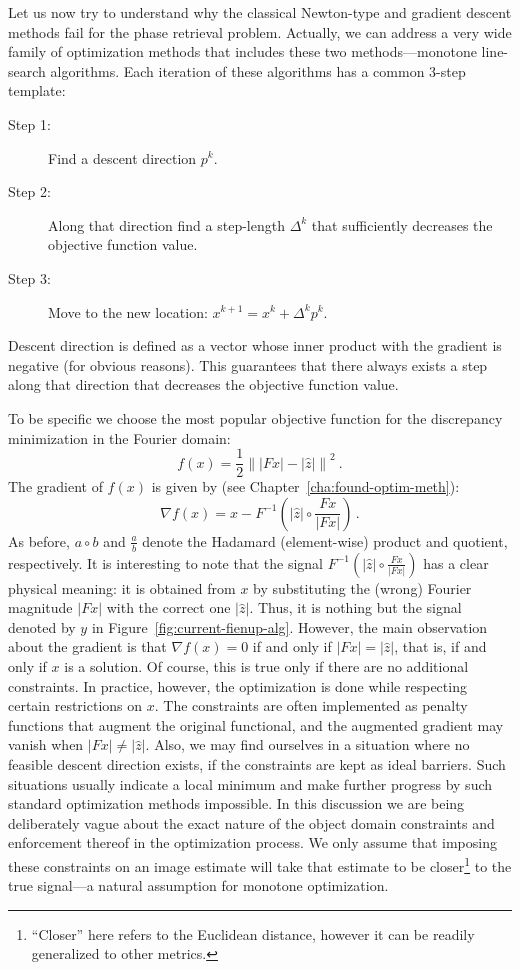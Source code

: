 Let us now try to understand why the classical Newton-type and
gradient descent methods fail for the phase retrieval
problem. Actually, we can address a very wide family of optimization
methods that includes these two methods---monotone line-search
algorithms. Each iteration of these algorithms has a common 3-step
template:
\begin{description}
\item[Step 1:] Find a descent direction $p^{k}$.
\item[Step 2:] Along that direction find a step-length $\Delta^{k}$
  that sufficiently decreases the objective function value.
\item[Step 3:] Move to the new location: $x^{k+1} = x^{k}+\Delta^{k}p^{k}$.
\end{description}
Descent direction is defined as a vector whose
inner product with the gradient is negative (for obvious reasons). This
guarantees that there always exists a step along that direction that decreases the
objective function value.

To be specific we choose the most popular objective
function for the discrepancy minimization in the Fourier domain:
\begin{equation}
  \label{eq:approx-phase2-1}
  f(x) = \frac{1}{2}
  \left\|
    |Fx| - |\hat{z}|
  \right\|^{2}\ .
\end{equation}
The gradient of $f(x)$ is given by (see
Chapter~\ref{cha:found-optim-meth}):
\begin{equation}
  \label{eq:approx-phase2-2}
  \nabla f(x) = 
  x - F^{-1}
  \left(
    |\hat{z}|\circ\frac{Fx}{|Fx|}
  \right)\,.
\end{equation}
As before, $a\circ b$ and $\frac{a}{b}$ denote the Hadamard (element-wise)
product and quotient, respectively. It is interesting to note that the
signal $F^{-1}\left(|\hat{z}|\circ\frac{Fx}{|Fx|}\right)$ has a clear
physical meaning: it is obtained from $x$ by substituting the (wrong)
Fourier magnitude $|Fx|$ with the correct one $|\hat{z}|$. Thus, it is
nothing but the signal denoted by $y$ in
Figure~\ref{fig:current-fienup-alg}. However, the main observation
about the gradient is that $\nabla f(x)=0$ if and only if
$|Fx|=|\hat{z}|$, that is, if and only if $x$ is a solution.  Of course,
this is true only if there are no additional constraints. In practice,
however, the optimization is done while respecting certain restrictions on
$x$. The constraints are often implemented as penalty functions that
augment the original functional, and the augmented gradient may
vanish when $|Fx|\not=|\hat{z}|$. Also, we may find ourselves in a
situation where no feasible descent direction exists, if the
constraints are kept as ideal barriers. Such situations
usually 
indicate a local minimum and make further progress by such standard
optimization methods impossible.  In this discussion we are being
deliberately vague about the exact nature of the object domain
constraints and enforcement thereof in the optimization process. We
only assume that imposing these constraints on an image estimate will
take that estimate to be closer\footnote{``Closer'' here refers to the
Euclidean distance, however it can be readily generalized to other
metrics.} to the true signal---a natural
assumption for monotone optimization.

